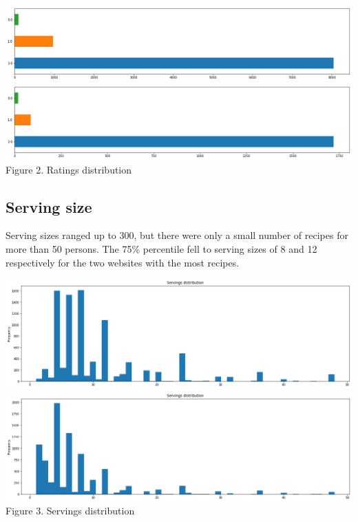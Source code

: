 \documentclass[11pt]{article}
\begin{document}
\vspace{5mm}
\begin{center}
\includegraphics[scale=0.085]{ratings-1}
\includegraphics[scale=0.085]{ratings-2}
\label{visalization-ratings} Figure 2. Ratings distribution
\end{center}
\vspace{5mm}

\subsection{Serving size}

Serving sizes ranged up to 300, but there were only a small number of recipes for more than 50 persons. The 75\% percentile fell to serving sizes of 8 and 12 respectively for the two websites with the most recipes. 

\vspace{5mm}
\begin{center}
\includegraphics[scale=0.085]{servings-1}
\includegraphics[scale=0.085]{servings-2}
\label{visalization-servings} Figure 3. Servings distribution
\end{center}
\vspace{5mm}
\end{document}
